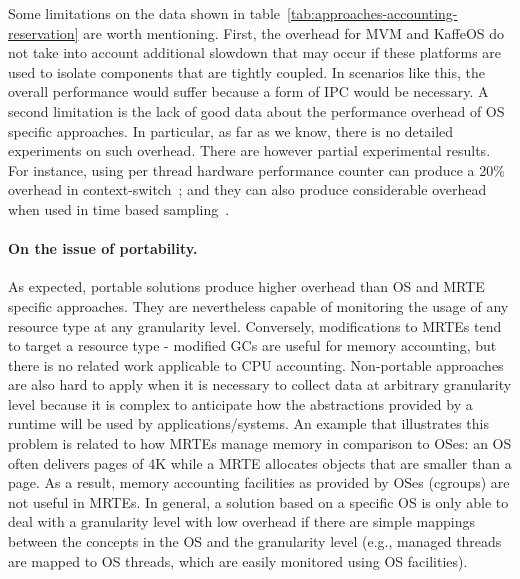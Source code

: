 Some limitations on the data shown in table~\ref{tab:approaches-accounting-reservation} are worth mentioning.
First, the overhead for MVM and KaffeOS do not take into account additional slowdown that may occur if these platforms are used to isolate components that are tightly coupled. 
In scenarios like this, the overall performance would suffer because a form of IPC would be necessary.
A second limitation is the lack of good data about the performance overhead of OS specific approaches.
In particular, as far as we know, there is no detailed experiments on such overhead.
There are however partial experimental results.
For instance, using per thread hardware performance counter can produce a 20\% overhead in context-switch~\cite{Weaver2013}; and they can also produce considerable overhead when used in time based sampling~\cite{Weaver2015}.

\paragraph{On the issue of portability.}
As expected, portable solutions produce higher overhead than OS and MRTE specific approaches.
They are nevertheless capable of monitoring the usage of any resource type at any granularity level.
Conversely, modifications to MRTEs tend to target a resource type - modified GCs are useful for memory accounting, but there is no related work applicable to CPU accounting.
Non-portable approaches are also hard to apply when it is necessary to collect data at arbitrary granularity level because it is complex to anticipate how the abstractions provided by a runtime will be used by applications/systems. 
An example that illustrates this problem is related to how MRTEs manage memory in comparison to OSes: an OS often delivers pages of 4K while a MRTE allocates objects that are smaller than a page.
As a result, memory accounting facilities as provided by OSes (cgroups) are not useful in MRTEs. 
In general, a solution based on a specific OS is only able to deal with a granularity level with low overhead if there are simple mappings between the concepts in the OS and the granularity level (e.g., managed threads are mapped to OS threads, which are easily monitored using OS facilities). 

